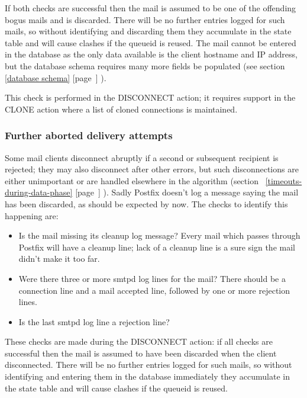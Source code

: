 \documentclass[a4paper,12pt,draft]{article}
\newcommand{\refwithpage}[1]{%
    \empty{}\ref{#1} [page~\pageref{#1}]%
}
\begin{document}
If both checks are successful then the mail is assumed to be one of the
offending bogus mails and is discarded.  There will be no further entries
logged for such mails, so without identifying and discarding them they
accumulate in the state table and will cause clashes if the queueid is
reused.  The mail cannot be entered in the database as the only data
available is the client hostname and IP address, but the database schema
requires many more fields be populated (see section~\refwithpage{database
schema}).

This check is performed in the DISCONNECT action; it requires support in
the CLONE action where a list of cloned connections is maintained.

\subsubsection{Further aborted delivery attempts}

Some mail clients disconnect abruptly if a second or subsequent recipient
is rejected; they may also disconnect after other errors, but such
disconnections are either unimportant or are handled elsewhere in the
algorithm (section~\refwithpage{timeouts-during-data-phase}).  Sadly
Postfix doesn't log a message saying the mail has been discarded, as should
be expected by now.  The checks to identify this happening are:

\begin{itemize}

    \item Is the mail missing its cleanup log message?  Every mail which
        passes through Postfix will have a cleanup line; lack of a cleanup
        line is a sure sign the mail didn't make it too far.

    \item Were there three or more smtpd log lines for the mail?  There
        should be a connection line and a mail accepted line, followed by
        one or more rejection lines.

    \item Is the last smtpd log line a rejection line?

\end{itemize}

These checks are made during the DISCONNECT action: if all checks are
successful then the mail is assumed to have been discarded when the client
disconnected.  There will be no further entries logged for such mails, so
without identifying and entering them in the database immediately they
accumulate in the state table and will cause clashes if the queueid is
reused.
\end{document}

